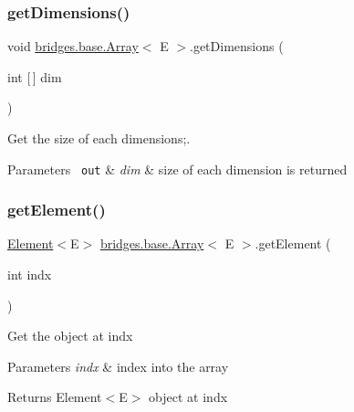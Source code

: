 \mbox{\label{classbridges_1_1base_1_1_array_af7aa7f3f18989af5f48a2b69cb7fb07d}} 
\subsubsection{\texorpdfstring{getDimensions()}{getDimensions()}}
{\footnotesize\ttfamily void \mbox{\hyperlink{classbridges_1_1base_1_1_array}{bridges.\+base.\+Array}}$<$ E $>$.get\+Dimensions (\begin{DoxyParamCaption}\item[{int \mbox{[}$\,$\mbox{]}}]{dim }\end{DoxyParamCaption})}



Get the size of each dimensions;. 


\begin{DoxyParams}[1]{Parameters}
\mbox{\texttt{ out}}  & {\em dim} & size of each dimension is returned \\
\hline
\end{DoxyParams}
\mbox{\label{classbridges_1_1base_1_1_array_a0e690cbe2606e44cce99b56802b63e0e}} 
\subsubsection{\texorpdfstring{getElement()}{getElement()}}
{\footnotesize\ttfamily \mbox{\hyperlink{classbridges_1_1base_1_1_element}{Element}}$<$E$>$ \mbox{\hyperlink{classbridges_1_1base_1_1_array}{bridges.\+base.\+Array}}$<$ E $>$.get\+Element (\begin{DoxyParamCaption}\item[{int}]{indx }\end{DoxyParamCaption})\hspace{0.3cm}{\ttfamily [protected]}}

Get the object at \textquotesingle{}indx\textquotesingle{}


\begin{DoxyParams}{Parameters}
{\em indx} & index into the array \\
\hline
\end{DoxyParams}
\begin{DoxyReturn}{Returns}
Element$<$\+E$>$ object at \textquotesingle{}indx\textquotesingle{} 
\end{DoxyReturn}
\mbox{\label{classbridges_1_1base_1_1_array_a808da9a62df3f0e7a905ec895a82087a}} 
